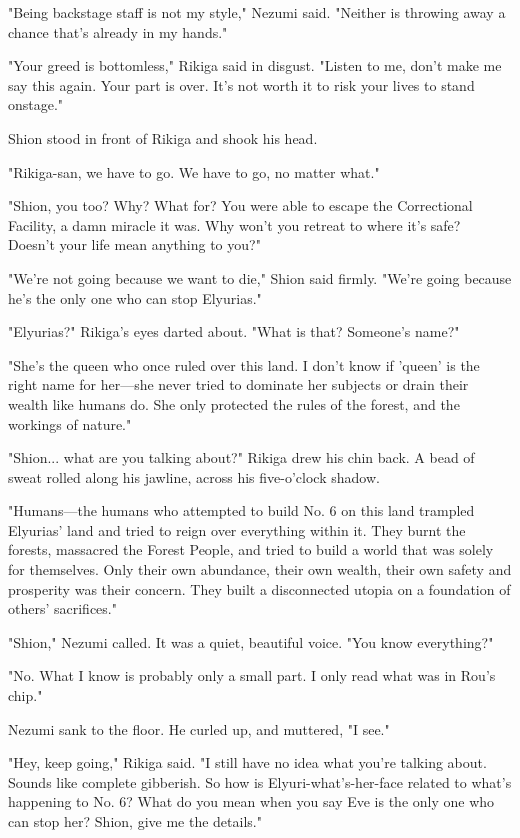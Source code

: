 "Being backstage staff is not my style," Nezumi said. "Neither is
throwing away a chance that's already in my hands."

"Your greed is bottomless," Rikiga said in disgust. "Listen to me, don't
make me say this again. Your part is over. It's not worth it to risk
your lives to stand onstage."

Shion stood in front of Rikiga and shook his head.

"Rikiga-san, we have to go. We have to go, no matter what."

"Shion, you too? Why? What for? You were able to escape the Correctional
Facility, a damn miracle it was. Why won't you retreat to where it's
safe? Doesn't your life mean anything to you?"

"We're not going because we want to die," Shion said firmly. "We're
going because he's the only one who can stop Elyurias."

"Elyurias?" Rikiga's eyes darted about. "What is that? Someone's name?"

"She's the queen who once ruled over this land. I don't know if 'queen'
is the right name for her---she never tried to dominate her subjects or
drain their wealth like humans do. She only protected the rules of the
forest, and the workings of nature."

"Shion... what are you talking about?" Rikiga drew his chin back. A bead
of sweat rolled along his jawline, across his five-o'clock shadow.

"Humans---the humans who attempted to build No. 6 on this land trampled
Elyurias' land and tried to reign over everything within it. They burnt
the forests, massacred the Forest People, and tried to build a world
that was solely for themselves. Only their own abundance, their own
wealth, their own safety and prosperity was their concern. They built a
disconnected utopia on a foundation of others' sacrifices."

"Shion," Nezumi called. It was a quiet, beautiful voice. "You know
everything?"

"No. What I know is probably only a small part. I only read what was in
Rou's chip."

Nezumi sank to the floor. He curled up, and muttered, "I see."

"Hey, keep going," Rikiga said. "I still have no idea what you're
talking about. Sounds like complete gibberish. So how is
Elyuri-what's-her-face related to what's happening to No. 6? What do you
mean when you say Eve is the only one who can stop her? Shion, give me
the details."

